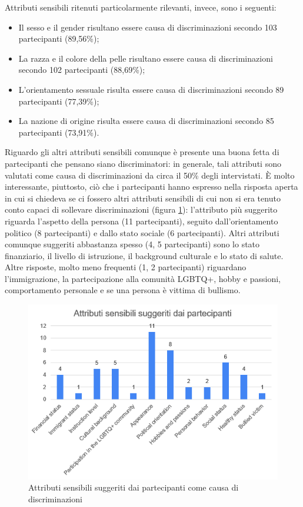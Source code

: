 Attributi sensibili ritenuti particolarmente rilevanti, invece, sono i seguenti:
\begin{itemize}
    \item Il sesso e il gender risultano essere causa di discriminazioni secondo 103 partecipanti (89,56\%);
    \item La razza e il colore della pelle risultano essere causa di discriminazioni secondo 102 partecipanti (88,69\%);
    \item L'orientamento sessuale risulta essere causa di discriminazioni secondo 89 partecipanti (77,39\%);
    \item La nazione di origine risulta essere causa di discriminazioni secondo 85 partecipanti (73,91\%).
\end{itemize}
Riguardo gli altri attributi sensibili comunque è presente una buona fetta di partecipanti che pensano siano discriminatori: in generale, tali attributi sono valutati come causa di discriminazioni da circa il 50\% degli intervistati. È molto interessante, piuttosto, ciò che i partecipanti hanno espresso nella risposta aperta in cui si chiedeva se ci fossero altri attributi sensibili di cui non si era tenuto conto capaci di sollevare discriminazioni (figura \ref{im-a-root-3}): l'attributo più suggerito riguarda l'aspetto della persona (11 partecipanti), seguito dall'orientamento politico (8 partecipanti) e dallo stato sociale (6 partecipanti). Altri attributi comunque suggeriti abbastanza spesso (4, 5 partecipanti) sono lo stato finanziario, il livello di istruzione, il background culturale e lo stato di salute. Altre risposte, molto meno frequenti (1, 2 partecipanti) riguardano l'immigrazione, la partecipazione alla comunità LGBTQ+, hobby e passioni, comportamento personale e se una persona è vittima di bullismo.\\

\begin{figure}[h!]
    \centering
    \includegraphics[width=360pt]{figure/data-analysis2/attroth.png}
    \caption{Attributi sensibili suggeriti dai partecipanti come causa di discriminazioni}
    \label{im-a-root-3}
\end{figure}

